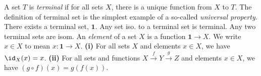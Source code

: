  A set $T$ is \textit{terminal} if for all sets $X$, there is a unique function from $X$ to $T$. The definition of terminal set is the simplest example of a so-called \textit{universal property}.
 There exists a terminal set, $\mathbf{1}$.
 Any set iso. to a terminal set is terminal.
 Any two terminal sets are isom.
 An \textit{element} of a set $X$ is a function $\mathbf{1} \to X$. We write $x \in X$ to mean $x \colon \mathbf{1} \to X$.
 \textbf{(i)} For all sets $X$ and elements $x \in X$, we have $\id_X(x) = x$. \textbf{(ii)} For all sets and functions $X \xrightarrow{f} Y \xrightarrow{g} Z$ and elements $x \in X$, we have $(g \circ f)(x) = g(f(x))$.
